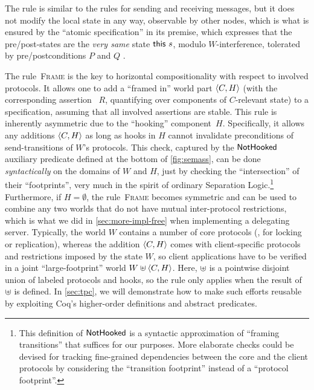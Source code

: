 The rule  is similar to the rules for sending and receiving
messages, but it does not modify the local state in any way,
observable by other nodes, which is what is ensured by the ``atomic
specification'' in its premise, which expresses that the
pre/post-states are the \emph{very same} state $\mathsf{this}~{s}$, modulo
$W$-interference, tolerated by pre/postconditions $P$ and $Q$ .

The rule~\textsc{Frame} is the key to horizontal compositionality with
respect to involved protocols. It allows one to add a ``framed in''
world part $\langle{C, H}\rangle$ (with the corresponding assertion ~$R$,
quantifying over components of $C$-relevant state) to a specification,
assuming that all involved assertions are stable.
%
This rule is inherently asymmetric due to the ``hooking''
component~$H$. Specifically, it allows any additions $\langle{C, H}\rangle$
as long as hooks in $H$ cannot invalidate preconditions of
send-transitions of $W$'s protocols. This check, captured by the
$\mathsf{NotHooked}$ auxiliary predicate defined at the bottom of
\cref{fig:semass}, can be done \emph{syntactically} on the domains
of $W$ and $H$, just by checking the ``intersection'' of their
``footprints'', very much in the spirit of ordinary Separation
Logic.\footnote{This definition of $\mathsf{NotHooked}$ is a syntactic
  approximation of ``framing \wrt transitions'' that suffices for our
  purposes. More elaborate checks could be devised for tracking
  fine-grained dependencies between the core and the client protocols
  by considering the ``transition footprint'' instead of a ``protocol
  footprint''.}
%
Furthermore, if $H = \emptyset$, the rule~\textsc{Frame}
becomes symmetric and can be used to combine any two worlds that do
not have mutual inter-protocol restrictions, which is what we did in
\cref{sec:more-impl-free} when implementing a delegating
server.
%
Typically, the world $W$ contains a number of core protocols (\eg, for
locking or replication), whereas the addition $\langle{C, H}\rangle$ comes
with client-specific protocols and restrictions imposed by the state
\wrt $W$, so client applications have to be verified in a joint
``large-footprint'' world $W \uplus \langle{C, H}\rangle$. Here, $\uplus$ is a
pointwise disjoint union of labeled protocols and hooks, so the rule
only applies when the result of $\uplus$ is defined.
%
In \cref{sec:tpc}, we will demonstrate how to make such efforts
reusable by exploiting Coq's higher-order definitions and abstract
predicates.

